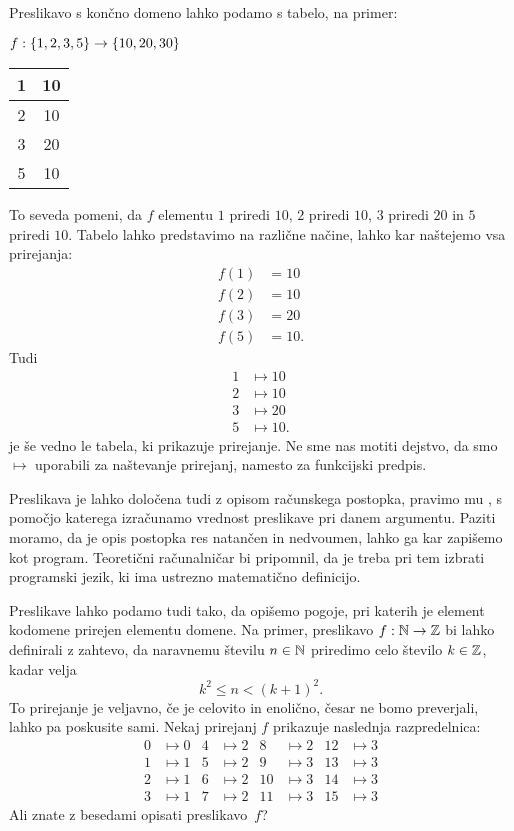 Preslikavo s končno domeno lahko podamo s tabelo, na primer:
%
\begin{center}
  $f : \set{1, 2, 3, 5} \to \set{10, 20, 30}$

  \medskip

  \begin{tabular}{|c|c|} \hline
    1 & 10 \\ \hline
    2 & 10 \\ \hline
    3 & 20 \\ \hline
    5 & 10 \\ \hline
  \end{tabular}
\end{center}
%
To seveda pomeni, da $f$ elementu $1$ priredi $10$, $2$ priredi $10$, $3$ priredi $20$ in $5$
priredi $10$. Tabelo lahko predstavimo na različne načine, lahko kar naštejemo vsa prirejanja:
%
\begin{align*}
  f(1) &= 10 \\
  f(2) &= 10 \\
  f(3) &= 20 \\
  f(5) &= 10.
\end{align*}
%
Tudi
%
\begin{align*}
  1 &\mapsto 10 \\
  2 &\mapsto 10 \\
  3 &\mapsto 20 \\
  5 &\mapsto 10.
\end{align*}
%
je še vedno le tabela, ki prikazuje prirejanje. Ne sme nas motiti dejstvo, da smo
$\mapsto$ uporabili za naštevanje prirejanj, namesto za funkcijski predpis.

Preslikava je lahko določena tudi z opisom računskega postopka, pravimo mu ,
s pomočjo katerega izračunamo vrednost preslikave pri danem argumentu. Paziti moramo, da je
opis postopka res natančen in nedvoumen, lahko ga kar zapišemo kot program. Teoretični
računalničar bi pripomnil, da je treba pri tem izbrati programski jezik, ki ima ustrezno
matematično definicijo.

Preslikave lahko podamo tudi tako, da opišemo pogoje, pri katerih je element kodomene
prirejen elementu domene. Na primer, preslikavo $f : \mathbb{N} \to \mathbb{Z}$ bi lahko definirali z
zahtevo, da naravnemu številu $n \in \mathbb{N}$ priredimo celo število $k \in \mathbb{Z}$, kadar velja
%
\begin{equation*}
  k^2 \leq n < (k+1)^2.
\end{equation*}
%
To prirejanje je veljavno, če je celovito in enolično, česar ne bomo preverjali, lahko pa
poskusite sami. Nekaj prirejanj $f$ prikazuje naslednja razpredelnica:
%
\begin{align*}
0 &\mapsto 0   &   4 &\mapsto 2   &    8  &\mapsto 2   &   12 &\mapsto 3 \\
1 &\mapsto 1   &   5 &\mapsto 2   &    9  &\mapsto 3   &   13 &\mapsto 3 \\
2 &\mapsto 1   &   6 &\mapsto 2   &    10 &\mapsto 3   &   14 &\mapsto 3 \\
3 &\mapsto 1   &   7 &\mapsto 2   &    11 &\mapsto 3   &   15 &\mapsto 3
\end{align*}
%
Ali znate z besedami opisati preslikavo~$f$?


